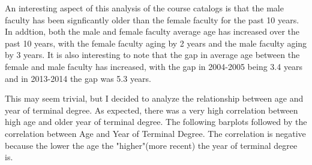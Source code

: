\documentclass[12pt,a4paper]{article}\usepackage[]{graphicx}\usepackage[]{color}
\theoremstyle{definition}
\begin{document}
\bigskip
An interesting aspect of this analysis of the course catalogs is that the male faculty has been signficantly older than the female faculty for the past 10 years. In addtion, both the male and female faculty average age has increased over the past 10 years, with the female faculty aging by 2 years and the male faculty aging by 3 years. It is also interesting to note that the gap in average age between the female and male faculty has increased, with the gap in 2004-2005 being 3.4 years and in 2013-2014 the gap was 5.3 years.

\bigskip
This may seem trivial, but I decided to analyze the relationship between age and year of terminal degree. As expected, there was a very high correlation between high age and older year of terminal degree. The following barplots followed by the correlation between Age and Year of Terminal Degree. The correlation is negative because the lower the age the "higher"(more recent) the year of terminal degree is.
\end{document}
